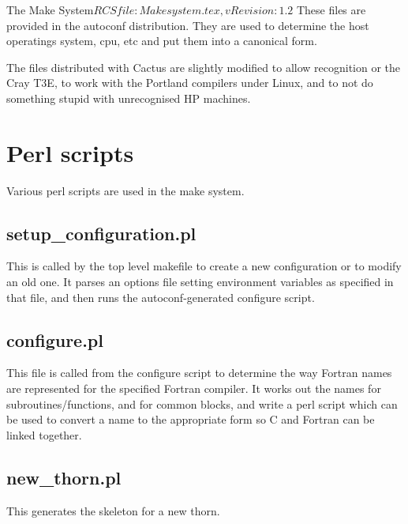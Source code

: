 \begin{cactuspart}{3}{The Make System}{$RCSfile: Makesystem.tex,v $}{$Revision: 1.2 $}
These files are provided in the autoconf distribution.  They are used to
determine the host operatings system, cpu, etc and put them into a
canonical form.

The files distributed with Cactus are slightly modified to allow recognition
or the Cray T3E, to work with the Portland compilers under Linux, and to
not do something stupid with unrecognised HP machines.

\chapter{Perl scripts}
\label{ch:perlscripts}

Various perl scripts are used in the make system.

\section{setup\_configuration.pl}
\label{sec:perlscripts:setup}

This is called by the top level makefile to create a new configuration or
to modify an old one.  It parses an options file setting environment 
variables as specified in that file, and then runs the autoconf-generated
configure script.

\section{configure.pl}
\label{sec:perlscripts:configure}

This file is called from the configure script to determine the way Fortran
names are represented for the specified Fortran compiler.  It works out the
names for subroutines/functions, and for common blocks, and write a
perl script which can be used to convert a name to the appropriate form so
C and Fortran can be linked together.

\section{new\_thorn.pl}
\label{sec:perlscripts:newthorn}

This generates the skeleton for a new thorn.

\end{cactuspart}
